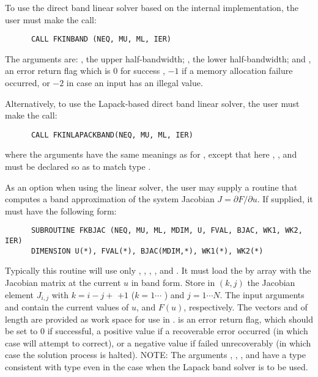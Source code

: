 \begin{Steps}
  To use the direct band linear solver based on the internal {\kinsol}
  implementation, the user must make the call:
\begin{verbatim}
      CALL FKINBAND (NEQ, MU, ML, IER)
\end{verbatim}
  The arguments are: , the upper half-bandwidth; , 
  the lower half-bandwidth; and , an error return flag which is 
  $0$ for success , $-1$ if a memory allocation failure occurred, or $-2$ 
  in case an input has an illegal value.     
  
  Alternatively, to use the Lapack-based direct band linear solver, 
  the user must make the call:
\begin{verbatim}
      CALL FKINLAPACKBAND(NEQ, MU, ML, IER)
\end{verbatim}
  where the arguments have the same meanings as for , except
  that here , , and  must be declared so as to match
  {\C} type .

  As an option when using the {\band} linear solver, the user may supply a
  routine that computes a band approximation of the system Jacobian 
  $J = \partial F / \partial u$. If supplied, it must have the following form:
\begin{verbatim}
      SUBROUTINE FKBJAC (NEQ, MU, ML, MDIM, U, FVAL, BJAC, WK1, WK2, IER)
      DIMENSION U(*), FVAL(*), BJAC(MDIM,*), WK1(*), WK2(*)
\end{verbatim}
  Typically this routine will use only , , ,
  , and .
  It must load the  by  array  with the Jacobian matrix
  at the current $u$ in band form.  Store in $(k,j)$ the Jacobian
  element $J_{i,j}$ with $k = i - j + $  $ + 1$ ($k = 1 \cdots $
  ) and $j = 1 \cdots N$.
  The input arguments  and  contain the current
  values of $u$, and $F(u)$, respectively.
  The vectors  and 
  of length  are provided as work space for use in
  .
   is an error return flag, which should be set to $0$ if successful,
  a positive value if a recoverable error occurred (in which case {\kinsol} will
  attempt to correct), or a negative value if  failed unrecoverably
  (in which case the solution process is halted).
  NOTE: The arguments , , , and  have a type
  consistent with {\C} type  even in the case when the Lapack band
  solver is to be used.


\end{Steps}
